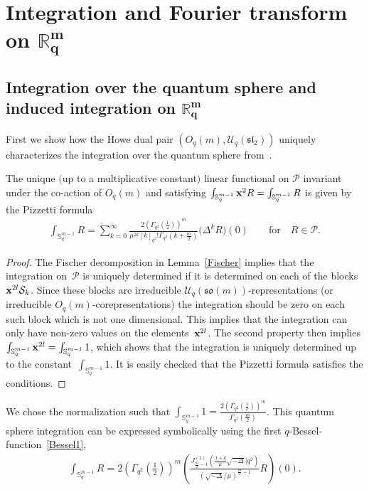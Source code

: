 \documentclass[pdftex]{sigma}
\newcommand{\mR}{\mathbb{R}}
\newcommand{\mS}{\mathbb{S}}
\newcommand{\cP}{\mathcal{P}}
\newcommand{\cS}{\mathcal{S}}
\newcommand{\cU}{\mathcal{U}}
\numberwithin{equation}{section}
\begin{document}
\section[Integration and Fourier transform on $\mR^m_q$]{Integration and Fourier transform on $\boldsymbol{\mR^m_q}$}

\subsection[Integration over the quantum sphere and induced integration on $\mR^m_q$]{Integration over the quantum sphere and induced integration on $\boldsymbol{\mR^m_q}$}
\label{DefFourier}

First we show how the Howe dual pair $(O_q(m),\cU_q(\mathfrak{sl}_2))$ uniquely characterizes the integration over the quantum sphere from~\cite{MR1408120}.

\begin{theorem}
\label{Pizzth}
The unique $($up to a multiplicative constant$)$ linear functional on $\cP$ invariant under the co-action of $O_q(m)$ and satisfying $\int_{\mS^{m-1}_q}\bold{x}^2R=\int_{\mS^{m-1}_q}R$ is given by the Pizzetti formula
\begin{gather*}
\int_{\mS^{m-1}_q}R= \sum_{k=0}^\infty\frac{2\left(\Gamma_{q^2}(\frac{1}{2})\right)^{m}}{\mu^{2k}[k]_{q^2}!
\Gamma_{q^2}(k+\frac{m}{2})}\big(\Delta^kR\big)(0)\qquad\mbox{for}\quad R\in\cP.
\end{gather*}
\end{theorem}

\begin{proof}
The Fischer decomposition in Lemma~\ref{Fischer} implies that the integration on~$\cP$ is uniquely determined if it is determined on each of the blocks $\bold{x}^{2l}\cS_k$. Since these blocks are irreducible $\cU_q(\mathfrak{so}(m))$-representations (or irreducible $O_q(m)$-corepresentations) the integration should be zero on each such block which is not one dimensional. This implies that the integration can only have non-zero values on the elements~$\bold{x}^{2l}$. The second property then implies $\int_{\mS^{m-1}_q}\bold{x}^{2l}=\int_{\mS^{m-1}_q}1$, which shows that the integration is uniquely determined up to the constant~$\int_{\mS^{m-1}_q}1$. It is easily checked that the Pizzetti formula satisf\/ies the conditions.
\end{proof}

We chose the normalization such that $\int_{\mS^{m-1}_q}1
=\frac{2\left(\Gamma_{q^2}(\frac{1}{2})\right)^{m}}{\Gamma_{q^2}(\frac{m}{2})}$.
This quantum sphere integration can be expressed symbolically using the f\/irst $q$-Bessel-function~\eqref{Bessel1},
\begin{gather}
\label{PizzBessel}
\int_{\mS^{m-1}_q}R = 2\left(\Gamma_{q^2}\left(\frac{1}{2}\right)\right)^{m}\left(\frac{J^{(1)}_{\frac{m}{2}-1}
\left(\frac{1+q}{\mu}\sqrt{-\Delta}|q^2\right)}{\left(\sqrt{-\Delta}/\mu\right)^{\frac{m}{2}-1}}R\right)(0).
\end{gather}
\end{document}

